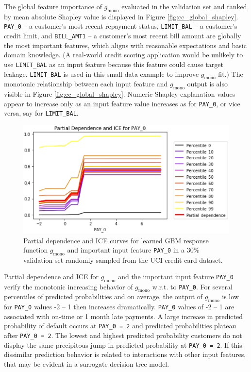 \documentclass[11pt]{asaproc}
\begin{document}
The global feature importance of $g_{\text{mono}}$ evaluated in the validation set and ranked by mean absolute Shapley value is displayed in Figure \ref{fig:cc_global_shapley}. \texttt{PAY\_0} -- a customer's most recent repayment status, \texttt{LIMIT\_BAL} -- a customer's credit limit, and \texttt{BILL\_AMT1} -- a customer's most recent bill amount are globally the most important features, which aligns with reasonable expectations and basic domain knowledge. (A real-world credit scoring application would be unlikely to use \texttt{LIMIT\_BAL} as an input feature because this feature could cause target leakage. \texttt{LIMIT\_BAL} is used in this small data example to improve $g_{\text{mono}}$ fit.) The monotonic relationship between each input feature and $g_{\text{mono}}$ output is also visible in Figure \ref{fig:cc_global_shapley}. Numeric Shapley explanation values appear to increase only as an input feature value increases as for \texttt{PAY\_0}, or vice versa, say for \texttt{LIMIT\_BAL}. 

\begin{figure}[htb]
	\begin{center}
		\includegraphics[scale=0.6]{img/figure_8.eps}
		\caption{Partial dependence and ICE curves for learned GBM response function $g_{\text{mono}}$ and important input feature \texttt{PAY\_0} in a 30\% validation set randomly sampled from the UCI credit card dataset.}
		\label{fig:cc_pdp_ice}
	\end{center}
\end{figure}

Partial dependence and ICE for $g_{\text{mono}}$ and the important input feature \texttt{PAY\_0} verify the monotonic increasing behavior of $g_{\text{mono}}$ w.r.t. to \texttt{PAY\_0}. For several percentiles of predicted probabilities and on average, the output of $g_{\text{mono}}$ is low for \texttt{PAY\_0} values -2 -- 1 then increases dramatically. \texttt{PAY\_0} values of -2 -- 1 are associated with on-time or 1 month late payments. A large increase in predicted probability of default occurs at \texttt{PAY\_0 = 2} and predicted probabilities plateau after \texttt{PAY\_0 = 2}. The lowest and highest predicted probability customers do not display the same precipitous jump in predicted probability at \texttt{PAY\_0 = 2}. If this dissimilar prediction behavior is related to interactions with other input features, that may be evident in a surrogate decision tree model.
\end{document}
